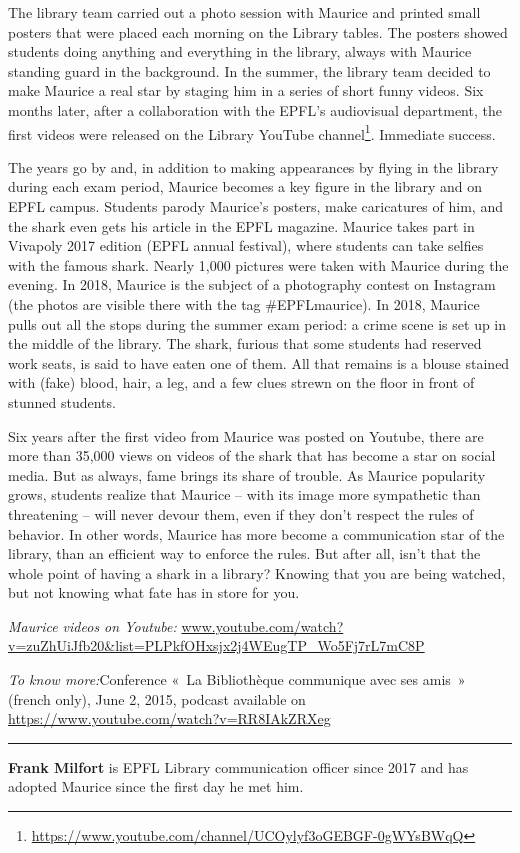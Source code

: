 \documentclass[a4paper,
fontsize=11pt,
oneside,
numbers=noperiodatend,
parskip=half-,
bibliography=totoc,
final
]{scrartcl}
\begin{document}
The library team carried out a photo session with Maurice and printed
small posters that were placed each morning on the Library tables. The
posters showed students doing anything and everything in the library,
always with Maurice standing guard in the background. In the summer, the
library team decided to make Maurice a real star by staging him in a
series of short funny videos. Six months later, after a collaboration
with the EPFL's audiovisual department, the first videos were released
on the Library YouTube channel\footnote{\url{https://www.youtube.com/channel/UCOylyf3oGEBGF-0gWYsBWqQ}}.
Immediate success.

The years go by and, in addition to making appearances by flying in the
library during each exam period, Maurice becomes a key figure in the
library and on EPFL campus. Students parody Maurice's posters, make
caricatures of him, and the shark even gets his article in the EPFL
magazine. Maurice takes part in Vivapoly 2017 edition (EPFL annual
festival), where students can take selfies with the famous shark. Nearly
1,000 pictures were taken with Maurice during the evening. In 2018,
Maurice is the subject of a photography contest on Instagram (the photos
are visible there with the tag \#EPFLmaurice). In 2018, Maurice pulls
out all the stops during the summer exam period: a crime scene is set up
in the middle of the library. The shark, furious that some students had
reserved work seats, is said to have eaten one of them. All that remains
is a blouse stained with (fake) blood, hair, a leg, and a few clues
strewn on the floor in front of stunned students.

Six years after the first video from Maurice was posted on Youtube,
there are more than 35,000 views on videos of the shark that has become
a star on social media. But as always, fame brings its share of trouble.
As Maurice popularity grows, students realize that Maurice -- with its
image more sympathetic than threatening -- will never devour them, even
if they don't respect the rules of behavior. In other words, Maurice has
more become a communication star of the library, than an efficient way
to enforce the rules. But after all, isn't that the whole point of
having a shark in a library? Knowing that you are being watched, but not
knowing what fate has in store for you.

\emph{Maurice videos on Youtube:}\newline
\url{www.youtube.com/watch?v=zuZhUiJfb20\&list=PLPkfOHxsjx2j4WEugTP_Wo5Fj7rL7mC8P}

\emph{To know more:}\newline Conference «~La Bibliothèque communique avec ses
amis~» (french only), June 2, 2015, podcast available on
\url{https://www.youtube.com/watch?v=RR8IAkZRXeg}

\begin{center}\rule{0.5\linewidth}{0.5pt}\end{center}

\textbf{Frank Milfort} is EPFL Library communication officer since
2017 and has adopted Maurice since the first day he met him.
\end{document}
